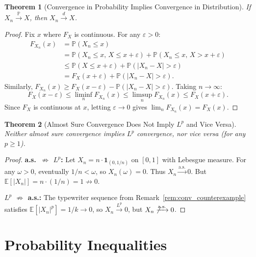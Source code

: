 \documentclass[11pt,a4paper]{article}
\theoremstyle{definition}
\theoremstyle{plain}
\newtheorem{theorem}{Theorem}[section]
\theoremstyle{remark}
\newcommand{\E}{\mathbb{E}}
\newcommand{\Prob}{\mathbb{P}}
\newcommand{\indicator}{\mathbf{1}}
\newcommand{\cas}{\xrightarrow{\text{a.s.}}}
\newcommand{\cprob}{\xrightarrow{\Prob}}
\newcommand{\clp}[1]{\xrightarrow{L^{#1}}}
\newcommand{\cdist}{\xrightarrow{d}}
\begin{document}
\begin{theorem}[Convergence in Probability Implies Convergence in Distribution]
\label{thm:prob_to_dist}
If $X_n \cprob X$, then $X_n \cdist X$.
\end{theorem}

\begin{proof}
Fix $x$ where $F_X$ is continuous. For any $\varepsilon > 0$:
\begin{align}
    F_{X_n}(x) &= \Prob(X_n \leq x) \nonumber\\
    &= \Prob(X_n \leq x,\, X \leq x + \varepsilon) + \Prob(X_n \leq x,\, X > x + \varepsilon) \nonumber\\
    &\leq \Prob(X \leq x + \varepsilon) + \Prob(|X_n - X| > \varepsilon) \nonumber\\
    &= F_X(x + \varepsilon) + \Prob(|X_n - X| > \varepsilon).
\end{align}
Similarly, $F_{X_n}(x) \geq F_X(x - \varepsilon) - \Prob(|X_n - X| > \varepsilon)$. Taking $n \to \infty$:
\begin{equation}
    F_X(x - \varepsilon) \leq \liminf_n F_{X_n}(x) \leq \limsup_n F_{X_n}(x) \leq F_X(x + \varepsilon).
\end{equation}
Since $F_X$ is continuous at $x$, letting $\varepsilon \to 0$ gives $\lim_n F_{X_n}(x) = F_X(x)$.
\end{proof}

\begin{theorem}[Almost Sure Convergence Does Not Imply $L^p$ and Vice Versa]
\label{thm:as_lp_no_implication}
Neither almost sure convergence implies $L^p$ convergence, nor vice versa (for any $p \geq 1$).
\end{theorem}

\begin{proof}
\textbf{a.s.\ $\not\Rightarrow$ $L^p$:} Let $X_n = n \cdot \indicator_{(0, 1/n)}$ on $[0,1]$ with Lebesgue measure. For any $\omega > 0$, eventually $1/n < \omega$, so $X_n(\omega) = 0$. Thus $X_n \cas 0$. But $\E[|X_n|] = n \cdot (1/n) = 1 \not\to 0$.

\textbf{$L^p$ $\not\Rightarrow$ a.s.:} The typewriter sequence from Remark~\ref{rem:conv_counterexample} satisfies $\E[|X_n|^p] = 1/k \to 0$, so $X_n \clp{p} 0$, but $X_n \not\cas 0$.
\end{proof}

\section{Probability Inequalities}
\label{sec:inequalities}
\end{document}
